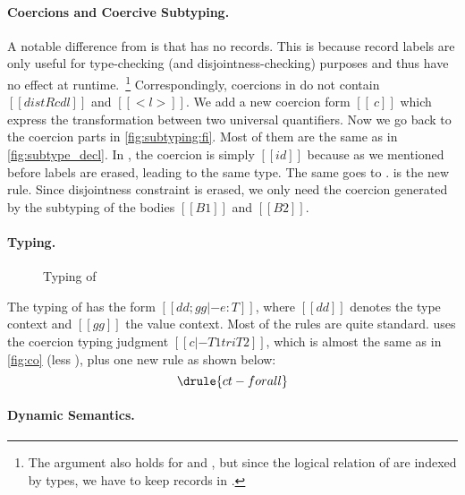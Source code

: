 \paragraph{Coercions and Coercive Subtyping.}

A notable difference from \tname is that \tnamee has no records. This is because
record labels are only useful for type-checking (and disjointness-checking)
purposes and thus have no effect at runtime.~\footnote{The argument also holds
  for \namee and \tname, but since the logical relation of \namee are indexed by
  \tname types, we have to keep records in \tname.} Correspondingly, coercions
in \tnamee do not contain $[[distRcd l]]$ and $[[ < l > ]]$. We add a new
coercion form $[[ \ c ]]$ which express the transformation between two universal
quantifiers. Now we go back to the coercion parts in \cref{fig:subtyping:fi}.
Most of them are the same as in \cref{fig:subtype_decl}. In ,
the coercion is simply $[[id]]$ because as we mentioned before labels are
erased, leading to the same type. The same goes to .
 is the new rule. Since disjointness constraint is erased, we
only need the coercion generated by the subtyping of the bodies $[[B1]]$ and
$[[B2]]$.


\paragraph{\tnamee Typing.}


\begin{figure}
  \centering
  \caption{Typing of \tnamee}
\end{figure}

The typing of \tnamee has the form $[[ dd ; gg |- e : T ]]$, where $[[dd]]$
denotes the type context and $[[gg]]$ the value context. Most of the rules are quite
standard.  uses the coercion typing judgment $[[ c |- T1 tri T2 ]]$, which
is almost the same as in \cref{fig:co} (less ), plus one new rule  as shown below:
\[
  \drule{ct-forall}
\]


\paragraph{\tnamee Dynamic Semantics.}

